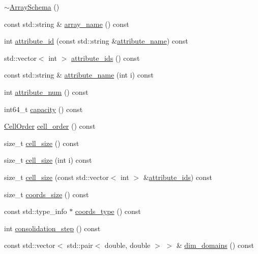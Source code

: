 \begin{DoxyCompactItemize}
\item 
\hyperlink{classArraySchema_a6a31559aaf6cb79fc7696186cc0bd44c}{$\sim$\+Array\+Schema} ()
\item 
const std\+::string \& \hyperlink{classArraySchema_ae6df338bba60ba3eae504b4643607778}{array\+\_\+name} () const 
\item 
int \hyperlink{classArraySchema_ad4c1390866e3dc27b6487b703aadddb1}{attribute\+\_\+id} (const std\+::string \&\hyperlink{classArraySchema_a453072375b942714fa355818f2d746ea}{attribute\+\_\+name}) const 
\item 
std\+::vector$<$ int $>$ \hyperlink{classArraySchema_a61357e5839af6acefcc7be9ef1a3b300}{attribute\+\_\+ids} () const 
\item 
const std\+::string \& \hyperlink{classArraySchema_a453072375b942714fa355818f2d746ea}{attribute\+\_\+name} (int i) const 
\item 
int \hyperlink{classArraySchema_a6964c50715e7cdedc5090bca375daf13}{attribute\+\_\+num} () const 
\item 
int64\+\_\+t \hyperlink{classArraySchema_ae438b6a084ea3b363fe51d555f5af746}{capacity} () const 
\item 
\hyperlink{classArraySchema_a847601130253f905337b5e284e1b78f2}{Cell\+Order} \hyperlink{classArraySchema_a15bc4e7fb776028c9705f38218eac785}{cell\+\_\+order} () const 
\item 
size\+\_\+t \hyperlink{classArraySchema_ad599e47358dc9de29a2788ddf134874d}{cell\+\_\+size} () const 
\item 
size\+\_\+t \hyperlink{classArraySchema_a7d466e3517a8416a5d3cdb6e4b6c9f70}{cell\+\_\+size} (int i) const 
\item 
size\+\_\+t \hyperlink{classArraySchema_a08e8041db1dadc674ee1c4137cb6be4b}{cell\+\_\+size} (const std\+::vector$<$ int $>$ \&\hyperlink{classArraySchema_a61357e5839af6acefcc7be9ef1a3b300}{attribute\+\_\+ids}) const 
\item 
size\+\_\+t \hyperlink{classArraySchema_ac7ad16c861a5929b22c31c0d7bf1912d}{coords\+\_\+size} () const 
\item 
const std\+::type\+\_\+info $\ast$ \hyperlink{classArraySchema_a4cadafe476273b0acfc2d137e011b5ef}{coords\+\_\+type} () const 
\item 
int \hyperlink{classArraySchema_ac60045afe56673ac365ecb754efd042f}{consolidation\+\_\+step} () const 
\item 
const std\+::vector$<$ std\+::pair$<$ double, double $>$ $>$ \& \hyperlink{classArraySchema_a7b134e05120440e3d4598884a85d92bc}{dim\+\_\+domains} () const 

\end{DoxyCompactItemize}

